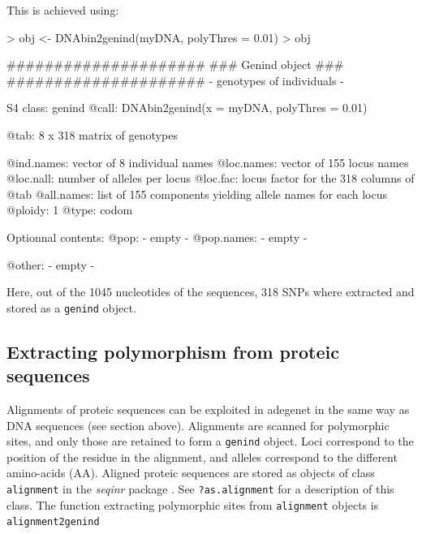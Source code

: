 \documentclass{article}
\begin{document}
This is achieved using:
\begin{Schunk}
\begin{Sinput}
> obj <- DNAbin2genind(myDNA, polyThres = 0.01)
> obj
\end{Sinput}
\begin{Soutput}
   #####################
   ### Genind object ### 
   #####################
- genotypes of individuals - 

S4 class:  genind
@call: DNAbin2genind(x = myDNA, polyThres = 0.01)

@tab:  8 x 318 matrix of genotypes

@ind.names: vector of  8 individual names
@loc.names: vector of  155 locus names
@loc.nall: number of alleles per locus
@loc.fac: locus factor for the  318 columns of @tab
@all.names: list of  155 components yielding allele names for each locus
@ploidy:  1
@type:  codom

Optionnal contents: 
@pop:  - empty -
@pop.names:  - empty -

@other: - empty -
\end{Soutput}
\end{Schunk}
Here, out of the 1045 nucleotides of the sequences, 318 SNPs where extracted and stored as a
\texttt{genind} object.






\subsection{Extracting polymorphism from proteic sequences}
Alignments of proteic sequences can be exploited in adegenet in the same way as DNA sequences (see
section above).
Alignments are scanned for polymorphic sites, and only those are retained to form a \texttt{genind} object.
Loci correspond to the position of the residue in the alignment, and alleles correspond to the
different amino-acids (AA).
Aligned proteic sequences are stored as objects of class \texttt{alignment} in the \emph{seqinr}
package \cite{np160}.
See \texttt{?as.alignment} for a description of this class.
The function extracting polymorphic sites from \texttt{alignment} objects is \texttt{alignment2genind}
\end{document}
